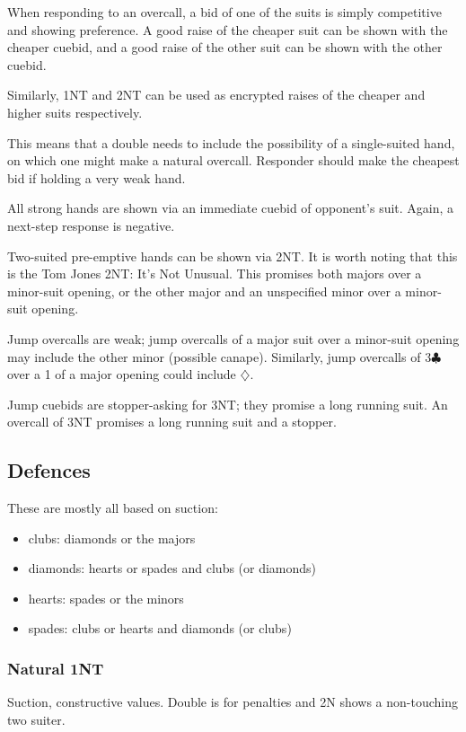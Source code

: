 \documentclass[a4paper,12pt]{article}
\begin{document}
When responding to an overcall, a bid of one of the suits is simply competitive
and showing preference.  A good raise of the cheaper suit can be shown with the
cheaper cuebid, and a good raise of the other suit can be shown with the other
cuebid.  

Similarly, 1NT and 2NT can be used as encrypted raises of the cheaper and
higher suits respectively.


This means that a double needs to include the possibility of a single-suited
hand, on which one might make a natural overcall.  Responder should make the
cheapest bid if holding a very weak hand.

All strong hands are shown via an immediate cuebid of opponent's suit.  Again,
a next-step response is negative.

Two-suited pre-emptive hands can be shown via 2NT.  It is worth noting that
this is the Tom Jones 2NT: It's Not Unusual.  This promises both majors over a
minor-suit opening, or the other major and an unspecified minor over a
minor-suit opening.  

Jump overcalls are weak; jump overcalls of a major suit over a minor-suit
opening may include the other minor (possible canape).  Similarly, jump
overcalls of 3$\clubsuit$ over a 1 of a major opening could include $\diamondsuit$.

Jump cuebids are stopper-asking for 3NT; they promise a long running suit.  An
overcall of 3NT promises a long running suit and a stopper.

\subsection{Defences}

These are mostly all based on suction:

\begin{itemize}
\item clubs: diamonds or the majors
\item diamonds: hearts or spades and clubs (or diamonds)
\item hearts: spades or the minors
\item spades: clubs or hearts and diamonds (or clubs)
\end{itemize}

\subsubsection{Natural 1NT}

Suction, constructive values. Double is for penalties and 2N shows a
non-touching two suiter.
\end{document}
